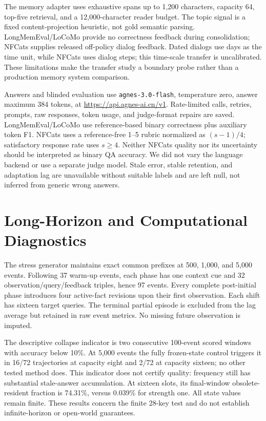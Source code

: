 The memory adapter uses exhaustive spans up to 1,200 characters, capacity 64, top-five retrieval, and a 12,000-character reader budget. The topic signal is a fixed content-projection heuristic, not gold semantic parsing. LongMemEval/LoCoMo provide no correctness feedback during consolidation; NFCats supplies released off-policy dialog feedback. Dated dialogs use days as the time unit, while NFCats uses dialog steps; this time-scale transfer is uncalibrated. These limitations make the transfer study a boundary probe rather than a production memory system comparison.

Answers and blinded evaluation use \texttt{agnes-3.0-flash}, temperature zero, answer maximum 384 tokens, at \url{https://api.agnes-ai.cn/v1}. Rate-limited calls, retries, prompts, raw responses, token usage, and judge-format repairs are saved. LongMemEval/LoCoMo use reference-based binary correctness plus auxiliary token F1. NFCats uses a reference-free 1--5 rubric normalized as $(s-1)/4$; satisfactory response rate uses $s\geq4$. Neither NFCats quality nor its uncertainty should be interpreted as binary QA accuracy. We did not vary the language backend or use a separate judge model. Stale error, stable retention, and adaptation lag are unavailable without suitable labels and are left null, not inferred from generic wrong answers.

\section{Long-Horizon and Computational Diagnostics}\label{app:stress}
The stress generator maintains exact common prefixes at 500, 1,000, and 5,000 events. Following 37 warm-up events, each phase has one context cue and 32 observation/query/feedback triples, hence 97 events. Every complete post-initial phase introduces four active-fact revisions upon their first observation. Each shift has sixteen target queries. The terminal partial episode is excluded from the lag average but retained in raw event metrics. No missing future observation is imputed.

The descriptive collapse indicator is two consecutive 100-event scored windows with accuracy below 10\%. At 5,000 events the fully frozen-state control triggers it in 16/72 trajectories at capacity eight and 2/72 at capacity sixteen; no other tested method does. This indicator does not certify quality: frequency still has substantial stale-answer accumulation. At sixteen slots, its final-window obsolete-resident fraction is 74.31\%, versus 0.039\% for strength one. All state values remain finite. These results concern the finite 28-key test and do not establish infinite-horizon or open-world guarantees.

